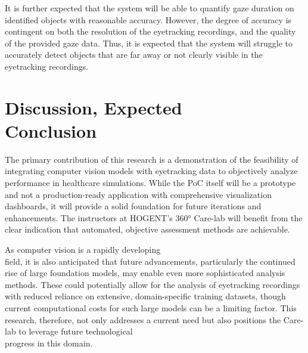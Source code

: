 \documentclass[english]{hogent-article}
\begin{document}
It is further expected that the system will be able to quantify gaze duration on identified objects with reasonable accuracy.
However, the degree of accuracy is contingent on both the resolution of the eyetracking recordings, and the quality of the provided gaze data.
Thus, it is expected that the system will struggle to accurately detect objects that are far away or not clearly visible in the eyetracking recordings. 

\section{Discussion, Expected\\ Conclusion}
\label{sec:discussion-conclusion}

The primary contribution of this research is a demonstration of the feasibility of 
integrating computer vision models with eyetracking data to objectively analyze performance in healthcare simulations.
While the PoC itself will be a prototype and not a production-ready application with comprehensive visualization dashboards, 
it will provide a solid foundation for future iterations and enhancements.
The instructors at HOGENT's 360° Care-lab will benefit from the clear indication that automated, 
objective assessment methods are achievable.

As computer vision is a rapidly developing\\ field, it is also anticipated that future advancements, 
particularly the continued rise of large foundation models, may enable even more sophisticated analysis methods. 
These could potentially allow for the analysis of eyetracking recordings with reduced reliance on extensive, 
domain-specific training datasets, though current computational costs for such large models can be a limiting factor. 
This research, therefore, not only addresses a current need but also positions the Care-lab to leverage future technological\\ progress in this domain.

\begingroup
\setlength{\emergencystretch}{3em}
\printbibliography[heading=bibintoc]
\endgroup
\end{document}
